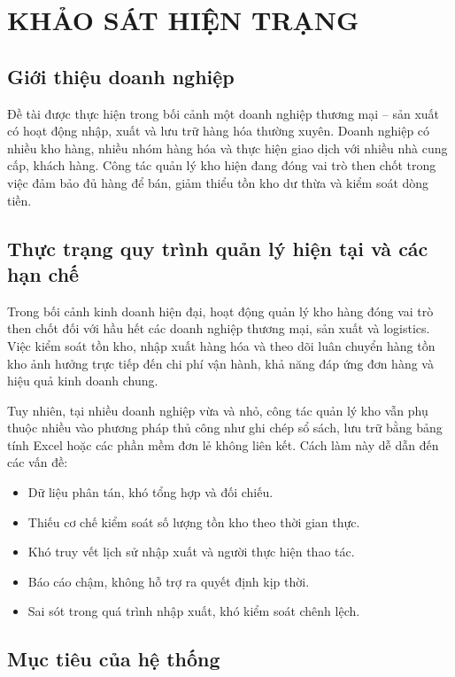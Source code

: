 \chapter{KHẢO SÁT HIỆN TRẠNG}

\section{Giới thiệu doanh nghiệp}

Đề tài được thực hiện trong bối cảnh một doanh nghiệp thương mại – sản xuất có hoạt động nhập, xuất và lưu trữ hàng hóa thường xuyên. Doanh nghiệp có nhiều kho hàng, nhiều nhóm hàng hóa và thực hiện giao dịch với nhiều nhà cung cấp, khách hàng. Công tác quản lý kho hiện đang đóng vai trò then chốt trong việc đảm bảo đủ hàng để bán, giảm thiểu tồn kho dư thừa và kiểm soát dòng tiền.

\section{Thực trạng quy trình quản lý hiện tại và các hạn chế}

Trong bối cảnh kinh doanh hiện đại, hoạt động quản lý kho hàng đóng vai trò then chốt đối với hầu hết các doanh nghiệp thương mại, sản xuất và logistics. Việc kiểm soát tồn kho, nhập xuất hàng hóa và theo dõi luân chuyển hàng tồn kho ảnh hưởng trực tiếp đến chi phí vận hành, khả năng đáp ứng đơn hàng và hiệu quả kinh doanh chung.

Tuy nhiên, tại nhiều doanh nghiệp vừa và nhỏ, công tác quản lý kho vẫn phụ thuộc nhiều vào phương pháp thủ công như ghi chép sổ sách, lưu trữ bằng bảng tính Excel hoặc các phần mềm đơn lẻ không liên kết. Cách làm này dễ dẫn đến các vấn đề:

\begin{itemize}[leftmargin=1.5cm]
    \item Dữ liệu phân tán, khó tổng hợp và đối chiếu.
    \item Thiếu cơ chế kiểm soát số lượng tồn kho theo thời gian thực.
    \item Khó truy vết lịch sử nhập xuất và người thực hiện thao tác.
    \item Báo cáo chậm, không hỗ trợ ra quyết định kịp thời.
    \item Sai sót trong quá trình nhập xuất, khó kiểm soát chênh lệch.
\end{itemize}

\section{Mục tiêu của hệ thống}

